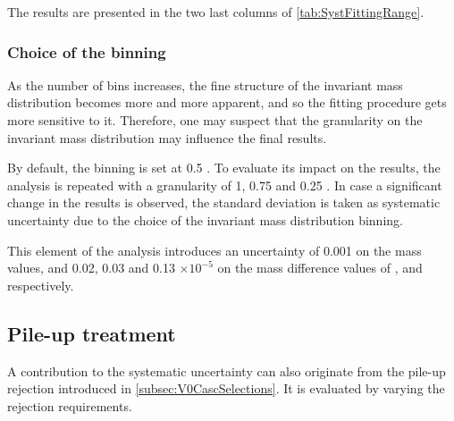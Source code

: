The results are presented in the two last columns of \tab\ref{tab:SystFittingRange}.

\subsubsection{Choice of the binning}

As the number of bins increases, the fine structure of the invariant mass distribution becomes more and more apparent, and so the fitting procedure gets more sensitive to it. Therefore, one may suspect that the granularity on the invariant mass distribution may influence the final results. 

By default, the binning is set at 0.5 \mmass. To evaluate its impact on the results, the analysis is repeated with a granularity of 1, 0.75 and 0.25 \mmass. In case a significant change in the results is observed, the standard deviation is taken as systematic uncertainty due to the choice of the invariant mass distribution binning.

This element of the analysis introduces an uncertainty of
0.001 \mmass on the mass values, and 0.02, 0.03 and 0.13 $\times 10^{-5}$ on the mass difference values of \rmLambda, \rmXi and \rmOmega respectively.

\subsection{Pile-up treatment}

A contribution to the systematic uncertainty can also originate from the pile-up rejection introduced in \Sec\ref{subsec:V0CascSelections}. It is evaluated by varying the rejection requirements. 

